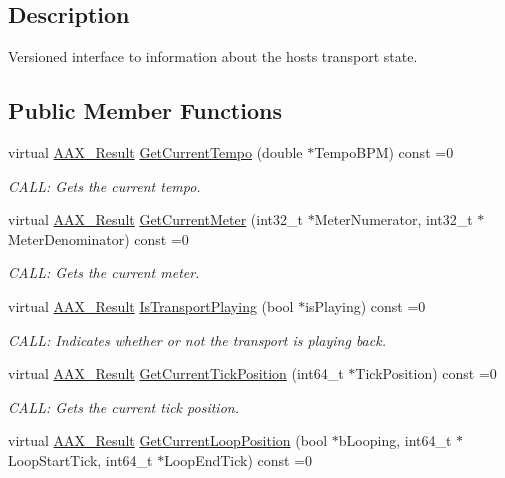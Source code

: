 \subsection{Description}
Versioned interface to information about the host\textquotesingle{}s transport state. \subsection*{Public Member Functions}
\begin{DoxyCompactItemize}
\item 
virtual \hyperlink{a00149_a4d8f69a697df7f70c3a8e9b8ee130d2f}{A\+A\+X\+\_\+\+Result} \hyperlink{a00082_ac0818801e66a6840216ac3657d7abcf1}{Get\+Current\+Tempo} (double $\ast$Tempo\+B\+P\+M) const =0
\begin{DoxyCompactList}\small\item\em C\+A\+L\+L\+: Gets the current tempo. \end{DoxyCompactList}\item 
virtual \hyperlink{a00149_a4d8f69a697df7f70c3a8e9b8ee130d2f}{A\+A\+X\+\_\+\+Result} \hyperlink{a00082_a8728c5cab60582e4a143f665a683ee7c}{Get\+Current\+Meter} (int32\+\_\+t $\ast$Meter\+Numerator, int32\+\_\+t $\ast$Meter\+Denominator) const =0
\begin{DoxyCompactList}\small\item\em C\+A\+L\+L\+: Gets the current meter. \end{DoxyCompactList}\item 
virtual \hyperlink{a00149_a4d8f69a697df7f70c3a8e9b8ee130d2f}{A\+A\+X\+\_\+\+Result} \hyperlink{a00082_adbcf084e01f37cb46fdb0f3024f02515}{Is\+Transport\+Playing} (bool $\ast$is\+Playing) const =0
\begin{DoxyCompactList}\small\item\em C\+A\+L\+L\+: Indicates whether or not the transport is playing back. \end{DoxyCompactList}\item 
virtual \hyperlink{a00149_a4d8f69a697df7f70c3a8e9b8ee130d2f}{A\+A\+X\+\_\+\+Result} \hyperlink{a00082_a3d60e3c360e1881bd5716a119d096769}{Get\+Current\+Tick\+Position} (int64\+\_\+t $\ast$Tick\+Position) const =0
\begin{DoxyCompactList}\small\item\em C\+A\+L\+L\+: Gets the current tick position. \end{DoxyCompactList}\item 
virtual \hyperlink{a00149_a4d8f69a697df7f70c3a8e9b8ee130d2f}{A\+A\+X\+\_\+\+Result} \hyperlink{a00082_aa59e02326a236afc153637d54f4789be}{Get\+Current\+Loop\+Position} (bool $\ast$b\+Looping, int64\+\_\+t $\ast$Loop\+Start\+Tick, int64\+\_\+t $\ast$Loop\+End\+Tick) const =0

\end{DoxyCompactItemize}
